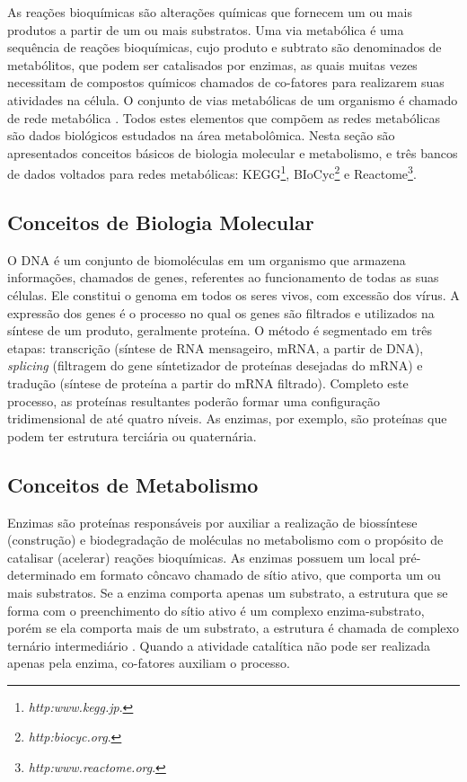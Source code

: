 \documentclass[conference]{IEEEtran}
\begin{document}
\indent As reações bioquímicas são alterações químicas que fornecem um ou mais produtos a partir de um ou mais substratos. Uma via metabólica é uma sequência de reações bioquímicas, cujo produto e subtrato são denominados de metabólitos, que podem ser catalisados por enzimas, as quais muitas vezes necessitam de compostos químicos chamados de co-fatores para realizarem suas atividades na célula. O conjunto de vias metabólicas de um organismo é chamado de rede metabólica \cite{Lehninger10}. Todos estes elementos que compõem as redes metabólicas são dados biológicos estudados na área metabolômica. Nesta seção são apresentados conceitos básicos de biologia molecular e metabolismo, e três bancos de dados voltados para redes metabólicas: KEGG\footnote{\textit{http:\/\/www.kegg.jp\/}.}, BIoCyc\footnote{\textit{http:\/\/biocyc.org}.} e Reactome\footnote{\textit{http:\/\/www.reactome.org}.}.

\subsection{Conceitos de Biologia Molecular}


\indent O DNA é um conjunto de biomoléculas em um organismo que armazena informações, chamados de genes, referentes ao funcionamento de todas as suas células. Ele constitui o genoma em todos os seres vivos, com excessão dos vírus. A expressão dos genes é o processo no qual os genes são filtrados e utilizados na síntese de um produto, geralmente proteína. O método é segmentado em três etapas: transcrição (síntese de RNA mensageiro, mRNA, a partir de DNA), \textit{splicing} (filtragem do gene síntetizador de proteínas desejadas do mRNA) e tradução (síntese de proteína a partir do mRNA filtrado). Completo este processo, as proteínas resultantes poderão formar uma configuração tridimensional de até quatro níveis. As enzimas, por exemplo, são proteínas que podem ter estrutura terciária ou quaternária.

\subsection{Conceitos de Metabolismo}

\indent Enzimas são proteínas responsáveis por auxiliar a realização de biossíntese (construção) e biodegradação de moléculas no metabolismo com o propósito de catalisar (acelerar) reações bioquímicas. As enzimas possuem um local pré-determinado em formato côncavo chamado de sítio ativo, que comporta um ou mais substratos. Se a enzima comporta apenas um substrato, a estrutura que se forma com o preenchimento do sítio ativo é um complexo enzima-substrato, porém se ela comporta mais de um substrato, a estrutura é chamada de complexo ternário intermediário \cite{Cap2schomburg}. Quando a atividade catalítica não pode ser realizada apenas pela enzima, co-fatores auxiliam o processo.
\end{document}
